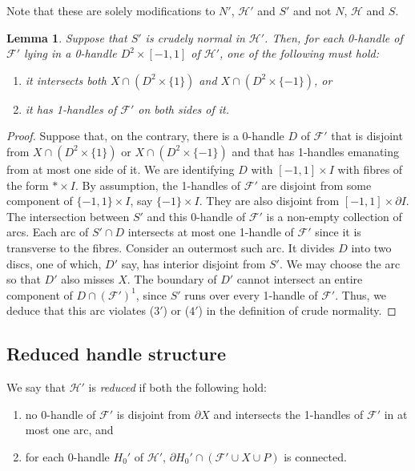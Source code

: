 \documentclass[oneside]{amsart}
\numberwithin{equation}{section}
\theoremstyle{plain}
\newtheorem{lemma}[equation]{Lemma}
\theoremstyle{definition}
\begin{document}
Note that these are solely modifications to $N'$, $\mathcal{H}'$ and $S'$ and not $N$, $\mathcal{H}$ and $S$.

\begin{lemma}
\label{Lem:HandlesBothSides}
Suppose that $S'$ is crudely normal in $\mathcal{H}'$. Then, for each 0-handle of $\mathcal{F}'$
lying in a 0-handle $D^2 \times [-1,1]$ of $\mathcal{H}'$, one of the following must hold:
\begin{enumerate}
\item it intersects both $X \cap (D^2 \times \{1\})$ and $X \cap (D^2 \times \{-1\})$, or
\item it has 1-handles of $\mathcal{F}'$ on both sides of it.
\end{enumerate}
\end{lemma}

\begin{proof} 
Suppose that, on the contrary, there is a 0-handle $D$ of $\mathcal{F}'$ that is disjoint from 
$X \cap (D^2 \times \{1\})$ or $X \cap (D^2 \times \{-1\})$ and that has
1-handles emanating from at most one side of it. We are identifying $D$
with $[-1,1] \times I$ with fibres of the form $\ast \times I$. By assumption, the 1-handles of $\mathcal{F}'$
are disjoint from some component of $\{ -1, 1 \} \times I$, say $\{ -1 \} \times I$. They are also disjoint from 
$[-1,1] \times \partial I$. The intersection between
$S'$ and this 0-handle of $\mathcal{F}'$ is a non-empty collection of arcs. Each arc of $S' \cap D$ intersects
at most one 1-handle of $\mathcal{F}'$ since it is transverse to the fibres. Consider an outermost such arc.
It divides $D$ into two discs, one of which, $D'$ say, has interior disjoint from $S'$. We may choose the arc so that
$D'$ also misses $X$. The boundary of $D'$
cannot intersect an entire component of $D \cap (\mathcal{F}')^1$, since $S'$ runs over every 1-handle
of $\mathcal{F}'$. Thus, we deduce that this arc violates ($3'$) or ($4'$) in the definition of crude
normality.
\end{proof}

\subsection{Reduced handle structure}

We say that $\mathcal{H}'$ is \emph{reduced} if both the following hold:
\begin{enumerate}
\item no 0-handle of $\mathcal{F}'$
is disjoint from $\partial X$ and intersects the 1-handles of $\mathcal{F}'$ in at most one arc, and
\item for each 0-handle $H_0'$ of $\mathcal{H}'$,
$\partial H_0' \cap (\mathcal{F}' \cup X \cup P)$ is connected.
\end{enumerate}
\end{document}
